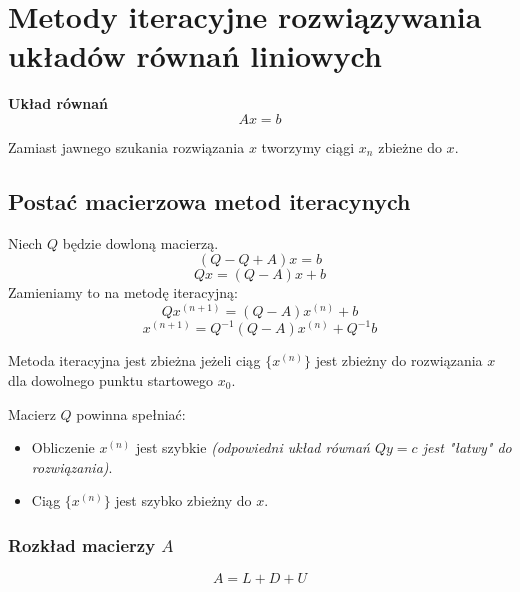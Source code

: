 \documentclass[../mn-notatki.tex]{subfiles}
\begin{document}
\section{Metody iteracyjne rozwiązywania układów równań liniowych}


\begin{tcolorbox}
\textbf{Układ równań}
\[
Ax = b
\]
\end{tcolorbox}

Zamiast jawnego szukania rozwiązania $x$ tworzymy ciągi $x_n$ zbieżne do $x.$

\subsection{Postać macierzowa metod iteracynych}

\begin{tcolorbox}
Niech $Q$ będzie dowloną macierzą.
\[
(Q - Q + A)x = b
\]
\[
Qx = (Q-A)x + b
\]
Zamieniamy to na metodę iteracyjną:
\[
Qx^{(n+1)} = (Q - A)x^{(n)} + b
\]
\[
x^{(n+1)} = Q^{-1}(Q - A)x^{(n)} + Q^{-1}b
\]
\end{tcolorbox}

\begin{tcolorbox}
Metoda iteracyjna jest zbieżna jeżeli ciąg $\{x^{(n)}\}$ jest zbieżny do
rozwiązania $x$ dla dowolnego punktu startowego $x_0$.
\end{tcolorbox}

Macierz $Q$ powinna spełniać:

\begin{itemize}
    \item Obliczenie $x^{(n)}$ jest szybkie \textit{(odpowiedni układ równań
    $Q y = c$ jest "łatwy" do rozwiązania)}.
    \item Ciąg  $\{x^{(n)}\}$  jest szybko zbieżny do $x$.
\end{itemize}

\pagebreak

\subsubsection{Rozkład macierzy $A$}
\begin{tcolorbox}
\[
A = L + D + U
\]
\end{tcolorbox}
\end{document}
